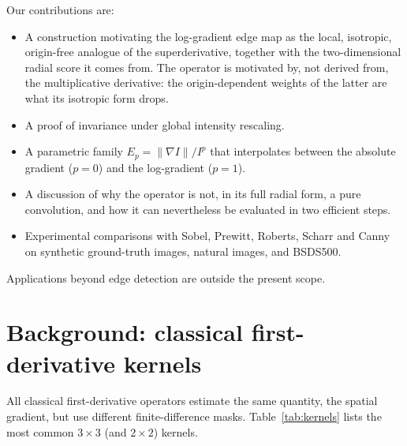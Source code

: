 \documentclass[conference]{IEEEtran}
\begin{document}
Our contributions are:
\begin{itemize}[leftmargin=1.4em]
  \item A construction motivating the log-gradient edge map as the local,
        isotropic, origin-free analogue of the superderivative, together with the
        two-dimensional radial score it comes from.  The operator is motivated
        by, not derived from, the multiplicative derivative: the origin-dependent
        weights of the latter are what its isotropic form drops.
  \item A proof of invariance under global intensity rescaling.
  \item A parametric family $E_p=\|\nabla I\|/I^p$ that interpolates
        between the absolute gradient ($p=0$) and the log-gradient ($p=1$).
  \item A discussion of why the operator is not, in its full radial form, a
        pure convolution, and how it can nevertheless be evaluated in two
        efficient steps.
  \item Experimental comparisons with Sobel, Prewitt, Roberts, Scharr and
        Canny on synthetic ground-truth images, natural images, and BSDS500.
\end{itemize}

Applications beyond edge detection are outside the present scope.

\section{Background: classical first-derivative kernels}
\label{sec:kernels}
All classical first-derivative operators estimate the same quantity, the
spatial gradient, but use different finite-difference masks.  Table~\ref{tab:kernels}
lists the most common $3\times3$ (and $2\times2$) kernels\cite{gonzales}.
\end{document}
